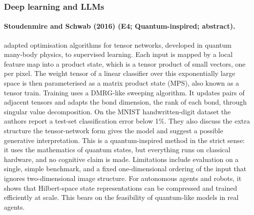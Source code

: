 \documentclass[10pt,a4paper]{article}
\begin{document}
\subsubsection*{Deep learning and LLMs}
\paragraph{Stoudenmire and Schwab (2016) (E4; Quantum-inspired; abstract).} \citet{Stoudenmire2016} adapted optimisation algorithms for tensor networks, developed in quantum many-body physics, to supervised learning. Each input is mapped by a local feature map into a product state, which is a tensor product of small vectors, one per pixel. The weight tensor of a linear classifier over this exponentially large space is then parameterised as a matrix product state (MPS), also known as a tensor train. Training uses a DMRG-like sweeping algorithm. It updates pairs of adjacent tensors and adapts the bond dimension, the rank of each bond, through singular value decomposition. On the MNIST handwritten-digit dataset the authors report a test-set classification error below 1\%. They also discuss the extra structure the tensor-network form gives the model and suggest a possible generative interpretation. This is a quantum-inspired method in the strict sense: it uses the mathematics of quantum states, but everything runs on classical hardware, and no cognitive claim is made. Limitations include evaluation on a single, simple benchmark, and a fixed one-dimensional ordering of the input that ignores two-dimensional image structure. For autonomous agents and robots, it shows that Hilbert-space state representations can be compressed and trained efficiently at scale. This bears on the feasibility of quantum-like models in real agents.
\end{document}
